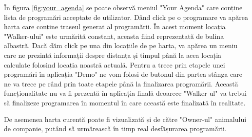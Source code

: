 În figura \ref{fig:your_agenda} se poate observă meniul "Your Agenda" care conține lista de programări acceptate de utilizator. Dând click pe o programare va apărea harta care conține traseul generat al programării. În acest moment locația "Walker-ului" este urmărită constant, aceasta fiind reprezentată de bulina albastră. Dacă dăm click pe una din locațiile de pe harta, va apărea un meniu care ne prezintă informații despre distanța și timpul până la acea locația calculate folosind locația noastră actuală. Pentru a trece prin etapele unei programări în aplicația "Demo" ne vom folosi de butonul din partea stânga care ne va trece pe rând prin toate etapele până la finalizarea programării. Această funcționalitate nu va fi prezentă în aplicația finală deoarece "Walker-ul" va trebui să finalizeze programarea în momentul în care această este finalizată în realitate. 

De asemenea harta curentă poate fi vizualizată și de către "Owner-ul" animalului de companie, putând să urmărească în timp real desfășurarea programării.

